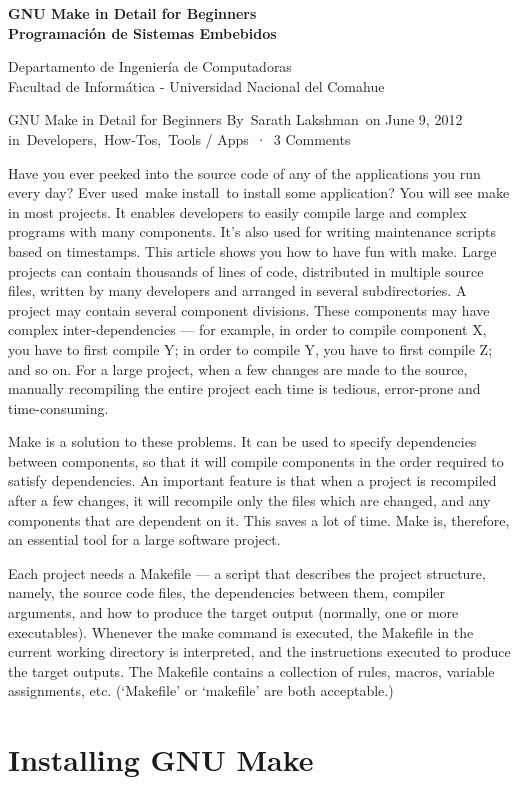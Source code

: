 \documentclass[12pt]{article}
\def\maketitle{

 \makeatletter
 {\color{bl} \centering \huge \sc \textbf{
 GNU Make in Detail for Beginners\\ 
\large \vspace*{-8pt} \color{black} Programación de Sistemas Embebidos
 \vspace*{8pt} }\par}
 \makeatother


 \makeatletter
 {\centering \small 
 	Departamento de Ingeniería de Computadoras \\
 	Facultad de Informática - Universidad Nacional del Comahue \\
 	\vspace{20pt} }
 \makeatother

}
\begin{document}
\thispagestyle{empty}
\maketitle
\setlength{\parindent}{0pt}




GNU Make in Detail for Beginners
By Sarath Lakshman on June 9, 2012 in Developers, How-Tos, Tools / Apps · 3 Comments

Have you ever peeked into the source code of any of the applications you run every day? Ever used make install to install some application? You will see make in most projects. It enables developers to easily compile large and complex programs with many components. It’s also used for writing maintenance scripts based on timestamps. This article shows you how to have fun with make.
Large projects can contain thousands of lines of code, distributed in multiple source files, written by many developers and arranged in several subdirectories. A project may contain several component divisions. These components may have complex inter-dependencies — for example, in order to compile component X, you have to first compile Y; in order to compile Y, you have to first compile Z; and so on. For a large project, when a few changes are made to the source, manually recompiling the entire project each time is tedious, error-prone and time-consuming.

Make is a solution to these problems. It can be used to specify dependencies between components, so that it will compile components in the order required to satisfy dependencies. An important feature is that when a project is recompiled after a few changes, it will recompile only the files which are changed, and any components that are dependent on it. This saves a lot of time. Make is, therefore, an essential tool for a large software project.

Each project needs a Makefile — a script that describes the project structure, namely, the source code files, the dependencies between them, compiler arguments, and how to produce the target output (normally, one or more executables). Whenever the make command is executed, the Makefile in the current working directory is interpreted, and the instructions executed to produce the target outputs. The Makefile contains a collection of rules, macros, variable assignments, etc. (‘Makefile’ or ‘makefile’ are both acceptable.)

\section *{Installing GNU Make}
\end{document}
